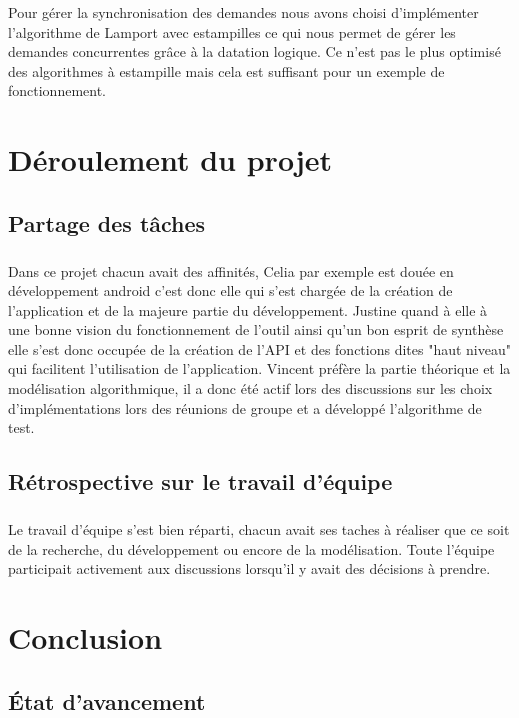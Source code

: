 \documentclass[a4paper,10pt]{report}
\begin{document}
Pour gérer la synchronisation des demandes nous avons choisi d'implémenter l'algorithme de Lamport avec estampilles ce qui nous permet de gérer les demandes concurrentes grâce à la datation logique. Ce n'est pas le plus optimisé des algorithmes à estampille mais cela est suffisant pour un exemple de fonctionnement.

\chapter{Déroulement du projet}
 \section{Partage des tâches}
 \paragraph{}
 Dans ce projet chacun avait des affinités, Celia par exemple est douée en développement android c'est donc elle qui s'est chargée de la création de l'application et de la majeure partie du développement. Justine quand à elle à une bonne vision du fonctionnement de l'outil ainsi qu'un bon esprit de synthèse elle s'est donc occupée de la création de l'API et des fonctions dites "haut niveau" qui facilitent l'utilisation de l'application. Vincent préfère la partie théorique et la modélisation algorithmique, il a donc été actif lors des discussions sur les choix d'implémentations lors des réunions de groupe et a développé l'algorithme de test.
 \section{Rétrospective sur le travail d'équipe}
 \paragraph{}
 Le travail d'équipe s'est bien réparti, chacun avait ses taches à réaliser que ce soit de la recherche, du développement ou encore de la modélisation. Toute l'équipe participait activement aux discussions lorsqu'il y avait des décisions à prendre.

\chapter{Conclusion}
\section{État d'avancement}
\end{document}
